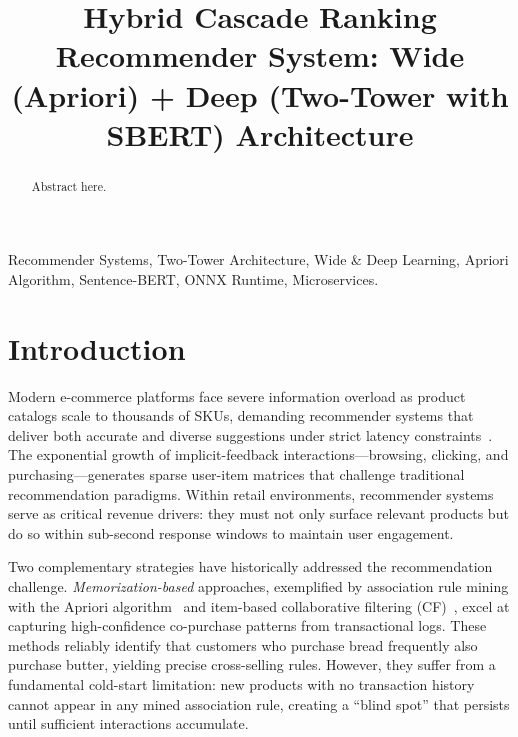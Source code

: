 \documentclass[10pt,conference]{IEEEtran}
\begin{document}
\title{Hybrid Cascade Ranking Recommender System: Wide (Apriori) + Deep (Two-Tower with SBERT) Architecture}

\author{
}

\maketitle

\begin{abstract}
Abstract here.
\end{abstract}

\begin{IEEEkeywords}
Recommender Systems, Two-Tower Architecture, Wide \& Deep Learning, Apriori Algorithm, Sentence-BERT, ONNX Runtime, Microservices.
\end{IEEEkeywords}

\section{Introduction}
\label{sec:intro}

Modern e-commerce platforms face severe information overload as product catalogs scale to thousands of SKUs, demanding recommender systems that deliver both accurate and diverse suggestions under strict latency constraints~\cite{zhang2019deep, covington2016deep}. The exponential growth of implicit-feedback interactions---browsing, clicking, and purchasing---generates sparse user-item matrices that challenge traditional recommendation paradigms. Within retail environments, recommender systems serve as critical revenue drivers: they must not only surface relevant products but do so within sub-second response windows to maintain user engagement.

Two complementary strategies have historically addressed the recommendation challenge. \textit{Memorization-based} approaches, exemplified by association rule mining with the Apriori algorithm~\cite{agrawal1994fast} and item-based collaborative filtering (CF)~\cite{sarwar2001item}, excel at capturing high-confidence co-purchase patterns from transactional logs. These methods reliably identify that customers who purchase bread frequently also purchase butter, yielding precise cross-selling rules. However, they suffer from a fundamental cold-start limitation: new products with no transaction history cannot appear in any mined association rule, creating a ``blind spot'' that persists until sufficient interactions accumulate.
\end{document}
